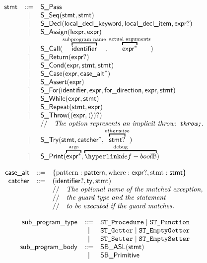 \documentclass{book}
\begin{document}
\[
\begin{array}{rcl}
\stmt &::=& \SPass\\
  &|& \SSeq(\stmt, \stmt)\\
  &|& \SDecl(\localdeclkeyword, \localdeclitem, \expr?)\\
  &|& \SAssign(\lexpr, \expr)\\
  &|& \SCall(\overtext{\identifier}{subprogram name}, \overtext{\expr^{*}}{actual arguments})\\
  &|& \SReturn(\expr?)\\
  &|& \SCond(\expr, \stmt, \stmt)\\
  &|& \SCase(\expr, \casealt^*)\\
  &|& \SAssert(\expr)\\
  &|& \SFor(\identifier, \expr, \fordirection, \expr, \stmt)\\
  &|& \SWhile(\expr, \stmt)\\
  &|& \SRepeat(\stmt, \expr)\\
  &|& \SThrow((\expr, \langle\rangle)?)\\
  & & \ASTComment{The option represents an implicit throw: \texttt{throw;}.}\\
  &|& \STry(\stmt, \catcher^*, \overname{\stmt?}{otherwise})\\
  &|& \SPrint(\overtext{\expr^*}{args}, \overtext{\Bool}{debug})
\end{array}
\]

\[
\begin{array}{rcl}
\textsf{case\_alt} &::=& \{ \text{pattern} : \textsf{pattern}, \text{where} : \textsf{expr}?, \text{stmt} : \textsf{stmt} \}\\
\textsf{catcher} &::=& (\textsf{identifier}?, \textsf{ty}, \textsf{stmt})\\
  & & //\quad\textit{The optional name of the matched exception,}\ \\
  & & //\quad\textit{the guard type and the statement}\ \\
  & & //\quad\textit{to be executed if the guard matches.}\ \\
\end{array}
\]

\[
\begin{array}{rcl}
\textsf{sub\_program\_type} &::=& \texttt{ST\_Procedure} \;|\; \texttt{ST\_Function}\\
                &|  & \texttt{ST\_Getter} \;|\; \texttt{ST\_EmptyGetter}\\
                &|  & \texttt{ST\_Setter} \;|\; \texttt{ST\_EmptySetter}\\
\textsf{sub\_program\_body} &::=& \textsf{SB\_ASL}(\textsf{stmt})\\
  &|& \textsf{SB\_Primitive}\\
\end{array}
\]
\end{document}
